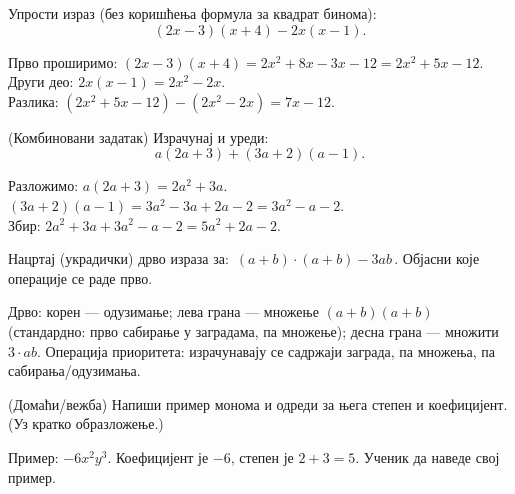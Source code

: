 \documentclass[10pt,a5paper,addpoints]{exam}
\begin{document}
\begin{questions}
\question[4]
Упрости израз (без коришћења формула за квадрат бинома):
\[
(2x-3)(x+4) - 2x(x-1).
\]
\begin{solution}
Прво проширимо: $(2x-3)(x+4)=2x^2+8x-3x-12=2x^2+5x-12$. \\
Други део: $2x(x-1)=2x^2-2x$. \\
Разлика: $(2x^2+5x-12)-(2x^2-2x)=7x-12$.
\end{solution}

\question[4]
(Комбиновани задатак) Израчунај и уреди:
\[
a(2a+3) + (3a+2)(a-1).
\]
\begin{solution}
Разложимо: $a(2a+3)=2a^2+3a$. \\
$(3a+2)(a-1)=3a^2-3a+2a-2=3a^2 - a -2$. \\
Збир: $2a^2+3a + 3a^2 - a -2 = 5a^2 +2a -2$.
\end{solution}

\question[3]
Нацртај (украдички) дрво израза за: \(\, (a+b)\cdot(a+b) - 3ab \,\). Објасни које операције се раде прво.
\begin{solution}
Дрво: корен — одузимање; лева грана — множење $(a+b)(a+b)$ (стандардно: прво сабирање у заградама, па множење); десна грана — множити $3\cdot ab$. Операција приоритета: израчунавају се садржаји заграда, па множења, па сабирања/одузимања.
\end{solution}

\question[3]
(Домаћи/вежба) Напиши пример монома и одреди за њега степен и коефицијент. (Уз кратко образложење.)
\begin{solution}
Пример: $-6x^2y^3$. Коефицијент је $-6$, степен је $2+3=5$. Ученик да наведе свој пример.
\end{solution}

\end{questions}
\end{document}

